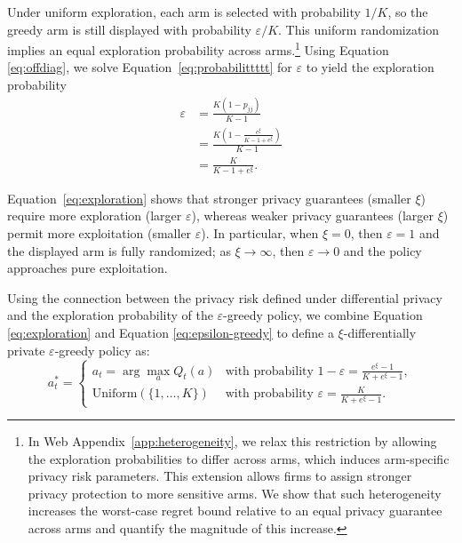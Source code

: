 \documentclass[mksc,nonblindrev]{informs3}
\begin{document}
Under uniform exploration, each arm is selected with probability \(1/K\), so the greedy arm is still displayed with probability \(\varepsilon/K\). This uniform randomization implies an equal exploration probability across arms.\footnote{In Web Appendix~\ref{app:heterogeneity}, we relax this restriction by allowing the exploration probabilities to differ across arms, which induces arm-specific privacy risk parameters. This extension allows firms to assign stronger privacy protection to more sensitive arms. We show that such heterogeneity increases the worst-case regret bound relative to an equal privacy guarantee across arms and quantify the magnitude of this increase.} Using Equation \eqref{eq:offdiag}, we solve Equation~\eqref{eq:probabilittttt} for $\varepsilon$ to yield the exploration probability
\begin{equation}\label{eq:exploration}
\begin{aligned}
\varepsilon
&= \frac{K(1-p_{jj})}{K-1} \\[4pt]
&= \frac{K\left(1-\frac{e^\xi}{K-1+e^\xi}\right)}{K-1} \\[4pt]
&= \frac{K}{K-1+e^\xi}.
\end{aligned}
\end{equation}

Equation~\eqref{eq:exploration} shows that stronger privacy guarantees (smaller \(\xi\)) require more exploration (larger \(\varepsilon\)), whereas weaker privacy guarantees (larger \(\xi\)) permit more exploitation (smaller \(\varepsilon\)). In particular, when \(\xi=0\), then \(\varepsilon=1\) and the displayed arm is fully randomized; as \(\xi\to\infty\), then \(\varepsilon\to 0\) and the policy approaches pure exploitation.

Using the connection between the privacy risk defined under differential privacy and the exploration probability of the $\varepsilon$-greedy policy, we combine Equation \eqref{eq:exploration} and Equation \eqref{eq:epsilon-greedy} to define a $\xi$-differentially private $\varepsilon$-greedy policy as:
\begin{equation}\label{eq:differential-greedy}
    a^{*}_t =
\begin{cases} 
a_{t}  = \arg\max_a Q_t(a) & \text{with probability } 1-\varepsilon  = \frac{e^\xi - 1}{K + e^\xi - 1},\\
\text{Uniform}(\{1,\dots,K\}) & \text{with probability } \varepsilon = \frac{K}{K + e^\xi - 1}.
\end{cases}
\end{equation}
\end{document}
